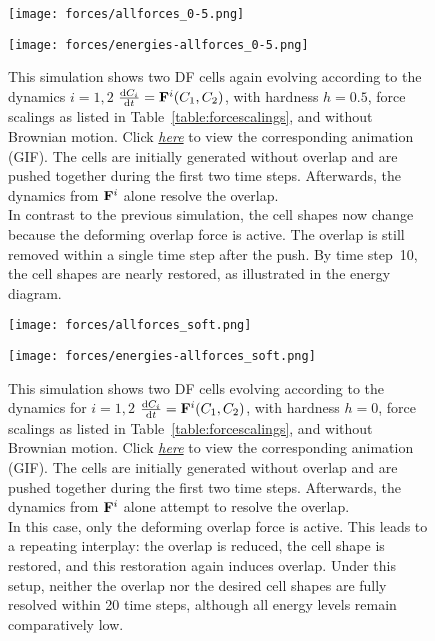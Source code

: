 \begin{figure}[htbp]
	\centering
	\texttt{[image: forces/allforces\_0-5.png]}\\[1ex]
	\begin{minipage}[c]{0.35\textwidth}
		\texttt{[image: forces/energies-allforces\_0-5.png]}
	\end{minipage}\hfill
	\begin{minipage}[c]{0.6\textwidth}
		\caption{
			This simulation shows two DF cells again evolving according to the dynamics $i=1,2$ $\frac{\mathrm{d} C_i}{\mathrm{d} t} = \mathbf{F}^i(C_1, C_2)$, with hardness $h=0.5$, force scalings as listed in Table~\ref{table:forcescalings}, and without Brownian motion.
			Click \href{https://github.com/tivo476c/FlexibleCellModel/blob/master/figures/gifs/showForces/show-allForces-hard5e-1.gif}{\textit{here}} to view the corresponding animation (GIF).
			The cells are initially generated without overlap and are pushed together during the first two time steps. Afterwards, the dynamics from $\mathbf{F}^i$ alone resolve the overlap.\\
			In contrast to the previous simulation, the cell shapes now change because the deforming overlap force is active. 
			The overlap is still removed within a single time step after the push. 
			By time step~10, the cell shapes are nearly restored, as illustrated in the energy diagram.
			}
		\label{fig:allForces-half}
	\end{minipage}
\end{figure}

\begin{figure}[htbp]
	\centering
	\texttt{[image: forces/allforces\_soft.png]}\\[1ex]
	\begin{minipage}[c]{0.35\textwidth}
		\texttt{[image: forces/energies-allforces\_soft.png]}
	\end{minipage}\hfill
	\begin{minipage}[c]{0.6\textwidth}
		\caption{
			This simulation shows two DF cells evolving according to the dynamics for $i=1,2$ $\frac{\mathrm{d} C_i}{\mathrm{d} t} = \mathbf{F}^i(C_1, C_2)$, with hardness $h=0$, force scalings as listed in Table~\ref{table:forcescalings}, and without Brownian motion.
			Click \href{https://github.com/tivo476c/FlexibleCellModel/blob/master/figures/gifs/showForces/show-allForces-soft.gif}{\textit{here}} to view the corresponding animation (GIF).
			The cells are initially generated without overlap and are pushed together during the first two time steps. Afterwards, the dynamics from $\mathbf{F}^i$ alone attempt to resolve the overlap.\\
			In this case, only the deforming overlap force is active. This leads to a repeating interplay: the overlap is reduced, the cell shape is restored, and this restoration again induces overlap.
			Under this setup, neither the overlap nor the desired cell shapes are fully resolved within 20 time steps, although all energy levels remain comparatively low.
		}
		\label{fig:allForces-soft}
	\end{minipage}
\end{figure}